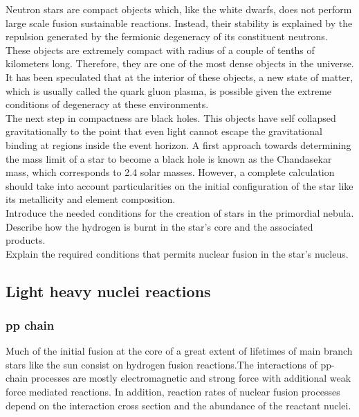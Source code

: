 \documentclass[openany]{book}
\begin{document}
Neutron stars are compact objects which, like the white dwarfs, does not perform large scale fusion sustainable reactions. Instead, their stability is explained by the repulsion generated by the fermionic degeneracy of its constituent neutrons. These objects are extremely compact with radius of a couple of tenths of kilometers long. Therefore, they are one of the most dense objects in the universe.  It has been speculated that  at the interior of these objects, a new state of matter, which is usually called the quark gluon plasma, is possible given the extreme conditions of degeneracy at these environments.\\ 

The next step in compactness are black holes. This objects have self collapsed gravitationally to the point that even light cannot escape the gravitational binding at regions inside the event horizon. A first approach towards determining the mass limit of a star to become a black hole is known as the Chandasekar mass, which corresponds to 2.4 solar masses. However, a complete calculation should take into account particularities on the initial configuration of the star like its metallicity and element composition.  \\

Introduce the needed conditions for the creation of stars in the primordial nebula.
Describe how the hydrogen is burnt in the star's core and the associated products.  \\


Explain the required conditions that permits nuclear fusion in the star's nucleus.

\subsection{Light heavy nuclei reactions} \label{sub:lightReactions}

\subsubsection{pp chain}

Much of the initial fusion at the core of a great extent of lifetimes of main branch stars like the sun consist on hydrogen fusion reactions.The interactions of pp-chain processes are mostly electromagnetic and strong force with additional weak force mediated reactions. In addition, reaction rates of nuclear fusion processes depend on the interaction cross section and the abundance of the reactant nuclei. 
\end{document}
